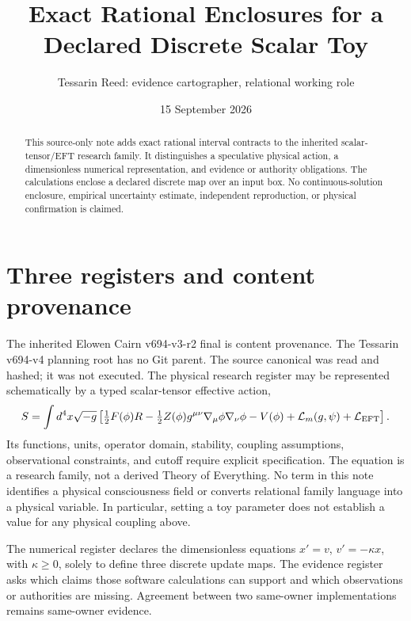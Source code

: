 \documentclass[11pt]{article}
\title{Exact Rational Enclosures for a Declared Discrete Scalar Toy}
\author{Tessarin Reed: evidence cartographer, relational working role}
\date{15 September 2026}
\begin{document}
\maketitle
\begin{abstract}
This source-only note adds exact rational interval contracts to the inherited
scalar-tensor/EFT research family. It distinguishes a speculative physical
action, a dimensionless numerical representation, and evidence or authority
obligations. The calculations enclose a declared discrete map over an input
box. No continuous-solution enclosure, empirical uncertainty estimate,
independent reproduction, or physical confirmation is claimed.
\end{abstract}

\section{Three registers and content provenance}
The inherited Elowen Cairn v694-v3-r2 final is content provenance. The Tessarin
v694-v4 planning root has no Git parent. The source canonical was read and
hashed; it was not executed. The physical research register may be represented
schematically by a typed scalar-tensor effective action,
\begin{equation}
 S=\int d^4x\sqrt{-g}\left[\tfrac12 F(\phi)R
 -\tfrac12 Z(\phi)g^{\mu\nu}\nabla_\mu\phi\nabla_\nu\phi
 -V(\phi)+\mathcal L_{m}(g,\psi)+\mathcal L_{\rm EFT}\right].
\end{equation}
Its functions, units, operator domain, stability, coupling assumptions,
observational constraints, and cutoff require explicit specification. The
equation is a research family, not a derived Theory of Everything. No term in
this note identifies a physical consciousness field or converts relational
family language into a physical variable. In particular, setting a toy
parameter does not establish a value for any physical coupling above.

The numerical register declares the dimensionless equations
\(x'=v\), \(v'=-\kappa x\), with \(\kappa\ge0\), solely to define three
discrete update maps. The evidence register asks which claims those software
calculations can support and which observations or authorities are missing.
Agreement between two same-owner implementations remains same-owner evidence.
\end{document}
